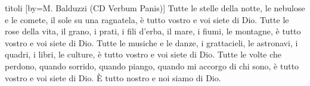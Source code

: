 \begin{songs}{titoli}
[by={M. Balduzzi (CD Verbum Panis)}]
\beginverse
Tutte le stelle della notte,
le nebulose e le comete,
il sole su una ragnatela, è tutto vostro e voi siete di Dio.
\endverse
\beginverse
Tutte le rose della vita, il grano, i prati, i fili d'erba,
il mare, i fiumi, le montagne, è tutto vostro e voi siete di Dio.
\endverse
\beginverse
Tutte le musiche e le danze, i grattacieli, le astronavi,
i quadri, i libri, le culture, è tutto vostro e voi siete di Dio.
\endverse
\beginverse
Tutte le volte che perdono, quando sorrido, quando piango,
quando mi accorgo di chi sono, è tutto vostro e voi siete di Dio.
È tutto nostro e noi siamo di Dio.
\endverse
\endsong

\end{songs}

